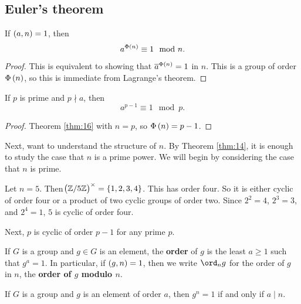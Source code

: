 \subsection{Euler's theorem}

\begin{theorem}
\label{thm:16}
If $ \br{a, n} = 1 $, then
$$ a^{\Phi\br{n}} \equiv 1 \mod n. $$
\end{theorem}

\begin{proof}
This is equivalent to showing that $ \overline{a}^{\Phi\br{n}} = 1 $ in $ \unit{n} $. This is a group of order $ \Phi\br{n} $, so this is immediate from Lagrange's theorem.
\end{proof}

\begin{corollary}
If $ p $ is prime and $ p \nmid a $, then
$$ a^{p - 1} \equiv 1 \mod p. $$
\end{corollary}

\begin{proof}
Theorem \ref{thm:16} with $ n = p $, so $ \Phi\br{n} = p - 1 $.
\end{proof}

Next, want to understand the structure of $ \unit{n} $. By Theorem \ref{thm:14}, it is enough to study the case that $ n $ is a prime power. We will begin by considering the case that $ n $ is prime.

\begin{example*}
Let $ n = 5 $. Then$ \unit{5} = \cbr{1, 2, 3, 4} $. This has order four. So it is either cyclic of order four or a product of two cyclic groups of order two. Since $ 2^2 = 4 $, $ 2^3 = 3 $, and $ 2^4 = 1 $, $ \unit{5} $ is cyclic of order four.
\end{example*}

Next, $ \unit{p} $ is cyclic of order $ p - 1 $ for any prime $ p $.


\begin{definition}
If $ G $ is a group and $ g \in G $ is an element, the \textbf{order} of $ g $ is the least $ a \ge 1 $ such that $ g^a = 1 $. In particular, if $ \br{g, n} = 1 $, then we write $ \ord_n g $ for the order of $ g $ in $ \unit{n} $, the \textbf{order of $ g $ modulo $ n $}.
\end{definition}

\begin{proposition}
\label{prop:19}
If $ G $ is a group and $ g $ is an element of order $ a $, then $ g^n = 1 $ if and only if $ a \mid n $.
\end{proposition}

